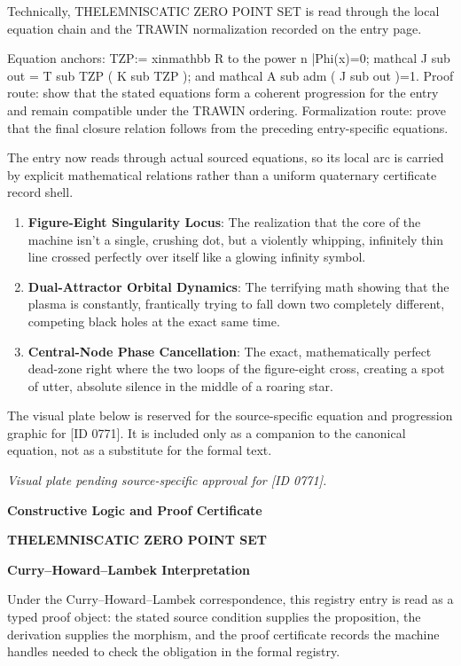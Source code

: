 Technically, THELEMNISCATIC ZERO POINT SET is read through the local equation chain and the TRAWIN normalization recorded on the entry page.

Equation anchors: TZP:= xinmathbb R to the power n |Phi(x)=0; mathcal J sub out = T sub TZP ( K sub TZP ); and mathcal A sub adm ( J sub out )=1. Proof route: show that the stated equations form a coherent progression for the entry and remain compatible under the TRAWIN ordering. Formalization route: prove that the final closure relation follows from the preceding entry-specific equations.

The entry now reads through actual sourced equations, so its local arc is carried by explicit mathematical relations rather than a uniform quaternary certificate record shell.
\endgroup

\begin{enumerate}[leftmargin=1.6em,itemsep=6pt,topsep=4pt]
\item \textbf{Figure-Eight Singularity Locus}: The realization that the core of the machine isn't a single, crushing dot, but a violently whipping, infinitely thin line crossed perfectly over itself like a glowing infinity symbol.
\item \textbf{Dual-Attractor Orbital Dynamics}: The terrifying math showing that the plasma is constantly, frantically trying to fall down two completely different, competing black holes at the exact same time.
\item \textbf{Central-Node Phase Cancellation}: The exact, mathematically perfect dead-zone right where the two loops of the figure-eight cross, creating a spot of utter, absolute silence in the middle of a roaring star.
\end{enumerate}

\begingroup\footnotesize\sloppy
The visual plate below is reserved for the source-specific equation and progression graphic for [ID 0771]. It is included only as a companion to the canonical equation, not as a substitute for the formal text.
\par\endgroup
\begingroup\footnotesize\itshape
Visual plate pending source-specific approval for [ID 0771].
\par\endgroup

\clearpage
\begingroup\tzpsupportsetup
\noindent\textbf{\fontsize{10.8pt}{12.8pt}\selectfont [ID 0771] Constructive Logic and Proof Certificate}\par
\noindent\textbf{\fontsize{10pt}{12pt}\selectfont THELEMNISCATIC ZERO POINT SET}\par
\vspace{0.45em}
\begingroup
\footnotesize
\setlength{\parskip}{0.22em}
\setlength{\parindent}{0pt}
\noindent\textbf{Curry--Howard--Lambek Interpretation}\par
Under the Curry--Howard--Lambek correspondence, this registry entry is read as a typed proof
object: the stated source condition supplies the proposition, the derivation supplies the
morphism, and the proof certificate records the machine handles needed to check the obligation
in the formal registry.


